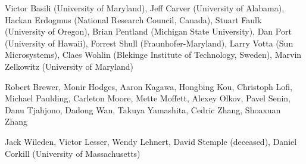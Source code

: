 \begin{Collaborators and Co-Editors}
\item Victor Basili (University of Maryland),
Jeff Carver (University of Alabama),
Hackan Erdogmus (National Research Council, Canada), 
Stuart Faulk (University of Oregon),
Brian Pentland (Michigan State University),
Dan Port (University of Hawaii),
Forrest Shull (Fraunhofer-Maryland),
Larry Votta (Sun Microsystems),
Claes Wohlin (Blekinge Institute of Technology, Sweden),
Marvin Zelkowitz (University of Maryland)
\end{Collaborators and Co-Editors}


\begin{Graduate Advisors and Postdoctoral Sponsors}
\item Robert Brewer,
Monir Hodges,
Aaron Kagawa, 
Hongbing Kou,
Christoph Lofi,
Michael Paulding,
Carleton Moore,
Mette Moffett,
Alexey Olkov,
Pavel Senin, 
Danu Tjahjono,
Dadong Wan,
Takuya Yamashita,
Cedric Zhang, 
Shoaxuan Zhang
\end{Graduate Advisors and Postdoctoral Sponsors}

\begin{Thesis Advisor and Postgraduate-Scholar Sponsor}
\item Jack Wileden, 
Victor Lesser, 
Wendy Lehnert, 
David Stemple (deceased), 
Daniel Corkill (University of Massachusetts)
\end{Thesis Advisor and Postgraduate-Scholar Sponsor}












